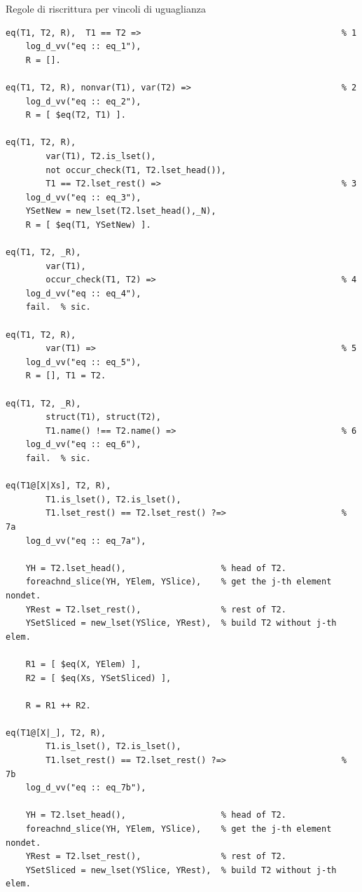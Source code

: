 \documentclass[12pt,a4paper,openright]{book} %
\begin{document}
\begin{algorithm}[H]
	\caption{Regole di riscrittura per vincoli di uguaglianza}
	\label{alg:eq_constraints}
\end{algorithm}
\begin{verbatim}
eq(T1, T2, R),  T1 == T2 =>                                        % 1
    log_d_vv("eq :: eq_1"),
    R = [].

eq(T1, T2, R), nonvar(T1), var(T2) =>                              % 2
    log_d_vv("eq :: eq_2"),
    R = [ $eq(T2, T1) ].

eq(T1, T2, R), 
        var(T1), T2.is_lset(),
	    not occur_check(T1, T2.lset_head()),
        T1 == T2.lset_rest() =>                                    % 3
    log_d_vv("eq :: eq_3"),
    YSetNew = new_lset(T2.lset_head(),_N),
    R = [ $eq(T1, YSetNew) ].

eq(T1, T2, _R), 
        var(T1),
        occur_check(T1, T2) =>                                     % 4
    log_d_vv("eq :: eq_4"),
    fail.  % sic.

eq(T1, T2, R), 
        var(T1) =>                                                 % 5
    log_d_vv("eq :: eq_5"),
    R = [], T1 = T2.

eq(T1, T2, _R), 
        struct(T1), struct(T2), 
        T1.name() !== T2.name() =>                                 % 6
    log_d_vv("eq :: eq_6"),
    fail.  % sic.

eq(T1@[X|Xs], T2, R), 
        T1.is_lset(), T2.is_lset(),
        T1.lset_rest() == T2.lset_rest() ?=>                       % 7a
    log_d_vv("eq :: eq_7a"),

    YH = T2.lset_head(),                   % head of T2.
    foreachnd_slice(YH, YElem, YSlice),    % get the j-th element nondet.
    YRest = T2.lset_rest(),                % rest of T2.
    YSetSliced = new_lset(YSlice, YRest),  % build T2 without j-th elem.

    R1 = [ $eq(X, YElem) ],
    R2 = [ $eq(Xs, YSetSliced) ],

    R = R1 ++ R2.

eq(T1@[X|_], T2, R), 
        T1.is_lset(), T2.is_lset(),
        T1.lset_rest() == T2.lset_rest() ?=>                       % 7b
    log_d_vv("eq :: eq_7b"),

    YH = T2.lset_head(),                   % head of T2.
    foreachnd_slice(YH, YElem, YSlice),    % get the j-th element nondet.
    YRest = T2.lset_rest(),                % rest of T2.
    YSetSliced = new_lset(YSlice, YRest),  % build T2 without j-th elem.


\end{verbatim}
\end{document}
